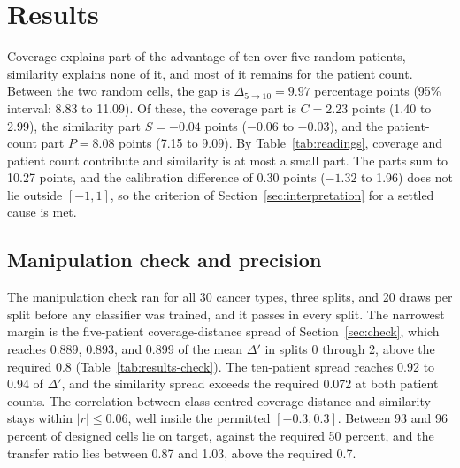 \section{Results}
\label{sec:results}
Coverage explains part of the advantage of ten over five random patients, similarity explains none of it, and most of it remains for the patient count. Between the two random cells, the gap is $\Delta_{5\to10}=9.97$ percentage points (95\% interval: 8.83 to 11.09). Of these, the coverage part is $C=2.23$ points (1.40 to 2.99), the similarity part $S=-0.04$ points ($-0.06$ to $-0.03$), and the patient-count part $P=8.08$ points (7.15 to 9.09). By Table~\ref{tab:readings}, coverage and patient count contribute and similarity is at most a small part. The parts sum to 10.27 points, and the calibration difference of 0.30 points ($-1.32$ to 1.96) does not lie outside $[-1,1]$, so the criterion of Section~\ref{sec:interpretation} for a settled cause is met.

\subsection{Manipulation check and precision}
\label{sec:check-results}
The manipulation check ran for all 30 cancer types, three splits, and 20 draws per split before any classifier was trained, and it passes in every split. The narrowest margin is the five-patient coverage-distance spread of Section~\ref{sec:check}, which reaches 0.889, 0.893, and 0.899 of the mean $\Delta'$ in splits 0 through 2, above the required 0.8 (Table~\ref{tab:results-check}). The ten-patient spread reaches 0.92 to 0.94 of $\Delta'$, and the similarity spread exceeds the required 0.072 at both patient counts. The correlation between class-centred coverage distance and similarity stays within $|r|\le0.06$, well inside the permitted $[-0.3,0.3]$. Between 93 and 96 percent of designed cells lie on target, against the required 50 percent, and the transfer ratio lies between 0.87 and 1.03, above the required 0.7.

